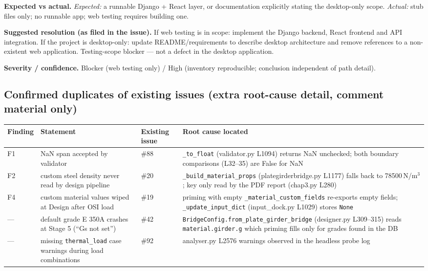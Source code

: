 \documentclass[11pt,a4paper]{article}
\begin{document}
\textbf{Expected vs actual.} \emph{Expected:} a runnable Django + React layer, or documentation explicitly stating the desktop-only scope. \emph{Actual:} stub files only; no runnable app; web testing requires building one.

\textbf{Suggested resolution (as filed in the issue).} If web testing is in scope: implement the Django backend, React frontend and API integration. If the project is desktop-only: update README/requirements to describe desktop architecture and remove references to a non-existent web application. Testing-scope blocker --- not a defect in the desktop application.

\textbf{Severity / confidence.} Blocker (web testing only) / High (inventory reproducible; conclusion independent of path detail).

\subsection{Confirmed duplicates of existing issues (extra root-cause detail, comment material only)}
\begin{longtable}{@{}p{2.6cm}p{5.4cm}p{3.2cm}p{4.2cm}@{}}
\toprule
Finding & Statement & Existing issue & Root cause located \\
\midrule
F1 & NaN span accepted by validator & \#88 & \texttt{\_to\_float} (validator.py L1094) returns NaN unchecked; both boundary comparisons (L32--35) are False for NaN \\
F2 & custom steel density never read by design pipeline & \#20 & \texttt{\_build\_material\_props} (plategirderbridge.py L1177) falls back to 78500\,N/m$^3$; key only read by the PDF report (chap3.py L280) \\
F4 & custom material values wiped at Design after OSI load & \#19 & priming with empty \texttt{\_material\_custom\_fields} re-exports empty fields; \texttt{\_update\_input\_dict} (input\_dock.py L1029) stores \texttt{None} \\
--- & default grade E 350A crashes at Stage 5 (``Gs not set'') & \#42 & \texttt{BridgeConfig.from\_plate\_girder\_bridge} (designer.py L309--315) reads \texttt{material.girder.g} which priming fills only for grades found in the DB \\
--- & missing \texttt{thermal\_load} case warnings during load combinations & \#92 & analyser.py L2576 warnings observed in the headless probe log \\
\bottomrule
\end{longtable}
\end{document}
